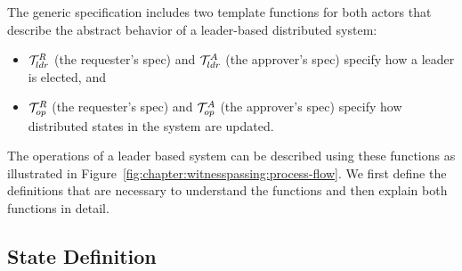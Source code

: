 The generic specification includes two template functions for both actors that describe the
abstract behavior of a leader-based distributed system:
\begin{itemize}
	\item $\mathcal{T}^{R}_{ldr}$ (the requester's spec) and  $\mathcal{T}^{A}_{ldr}$ (the approver's spec) specify how a leader is elected, and
	\item $\mathcal{T}^{R}_{op}$  (the requester's spec) and $\mathcal{T}^{A}_{op}$ (the approver's spec)  specify how distributed states in the system are
		updated.
\end{itemize}

The operations of a leader based system can be described using these functions
as illustrated in Figure~\ref{fig:chapter:witnesspassing:process-flow}.
We first define the definitions that are necessary to understand the
functions and then explain both functions in detail.

\subsection{State Definition}
\label{subsec:state-definition}

